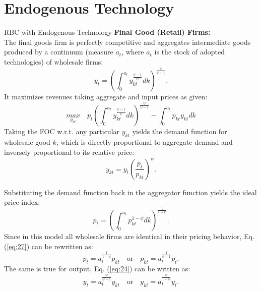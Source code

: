 \documentclass[compress,xcolor=dvipsnames]{beamer}
\newenvironment{noheadline}{
    \setbeamertemplate{headline}{}
    \addtobeamertemplate{frametitle}{\vspace*{-0.9\baselineskip}}{}
}{}
\begin{document}
\section{Endogenous Technology}

\begin{noheadline}
\begin{frame}{RBC with Endogenous Technology}
 \textbf{Final Good (Retail) Firms:} \\
The final goods firm is perfectly competitive and aggregates intermediate goods produced by a continuum (measure $a_t$, where $a_t$ is the stock of adopted technologies) of wholesale firms:
\begin{equation}  \label{eq:24}
y_t=\left(\int_0^{a_t}y_{kt}^{\frac{\psi-1}{\psi}}dk\right)^{\frac{\psi}{\psi-1}}.
\end{equation}
It maximizes revenues taking aggregate and input prices as given:
\begin{equation}
\underset{y_{kt}}{max}\quad p_t\left(\int_0^{a_t}y_{kt}^{\frac{\psi-1}{\psi}}dk\right)^{\frac{\psi}{\psi-1}}-\int_0^{a_t}p_{kt}y_{kt}dk
\end{equation}
Taking the FOC w.r.t. any particular $y_{kt}$ yields the demand function for wholesale good $k$, which is directly proportional to aggregate demand and inversely proportional to its relative price: 
\begin{equation} \label{eq:RSID}
y_{kt}=y_t \left(\frac{p_t}{p_{kt}}\right)^\psi.
\end{equation}
\end{frame}
\end{noheadline}


\begin{frame}
Substituting the demand function back in the aggregator function yields the ideal price index: 
\begin{equation} \label{eq:27}
p_t = \left( \int_0^{a_t}  p_{kt}^{1-\psi}dk \right)^{\frac{1}{1-\psi}}.
\end{equation}
Since in this model all wholesale firms are identical in their pricing behavior, Eq. (\ref{eq:27}) can be rewritten as:
\begin{equation}  \label{eq:PAG}
p_t = a_t^{\frac{1}{1-\psi}} p_{kt} \quad\text{or}\quad p_{kt}=a_t^{\frac{1}{\psi-1}} p_t.
\end{equation}
The same is true for output, Eq. (\ref{eq:24}) can be written as:
\begin{equation} \label{eq:OAG}
y_t = a_t^{\frac{\psi}{\psi-1}} y_{kt} \quad\text{or}\quad y_{kt}=a_t^{\frac{\psi}{1-\psi}} y_t.
\end{equation} 
\end{frame}
\end{document}
